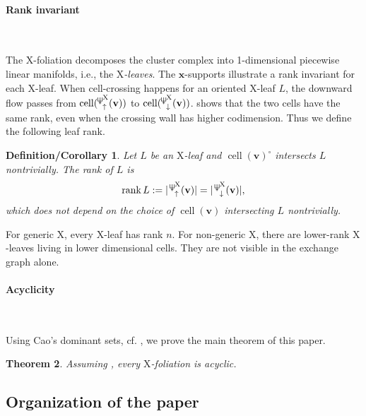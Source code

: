 \documentclass[11pt,reqno]{amsart}
\newcommand{\Neptune}{\mathord{\text{\tikz[baseline=-.5ex,scale=.13]{\draw[line width=.45pt] (0,0)--(0,1.8) (-.6,1.8)--(-.6,.8)--(.6,.8)--(.6,1.8) (-.35,.35)--(.35,.35);}}}}
\theoremstyle{plain}
\newtheorem{theorem}{Theorem}[section]
\newtheorem{cordef}[theorem]{Definition/Corollary}
\theoremstyle{definition}
\numberwithin{equation}{section}
\newcommand\<{\langle}
\renewcommand\>{\rangle}
\newcommand{\rank}{\operatorname{rank}}
\newcommand{\on}[1]{\operatorname{#1}}
\def\cc{\on{cell}}  %
\def\sphere{\on{S}}   %
\def\vv{\mathbf{v}}
\def\sink{X}
\newcommand{\ccpt}[1]{\mathrm{#1}}%
\def\xevo{\ccpt{X}}%
\def\xx{\mathbf{x}}%
\newcommand{\suppd}[1]{\operatorname{\Neptune}_{\downarrow}^{#1}}
\newcommand{\suppu}[1]{\operatorname{\Neptune}_{\uparrow}^{#1}}
\begin{document}
\paragraph{\textbf{Rank invariant}}\

The $\xevo$-foliation decomposes the cluster complex into 1-dimensional piecewise linear manifolds, i.e., the \emph{$\xevo$-leaves}.
The $\xx$-supports illustrate a rank invariant for each $\xevo$-leaf. 
When cell-crossing happens for an oriented $\xevo$-leaf $L$, the downward flow passes from $\cc(\suppu{\xevo}(\vv))$ to $\cc(\suppd{\xevo}(\vv))$. 
 shows that the two cells have the same rank, even when the crossing wall has higher codimension. 
Thus we define the following leaf rank.
\begin{cordef}
    Let $L$ be an $\xevo$-leaf and $\cc(\vv)^\circ$ intersects $L$ nontrivially. 
    The \emph{rank} of $L$ is
    \begin{gather}
        \rank L:=|\suppu{\xevo}(\vv)|=|\suppd{\xevo}(\vv)|,
    \end{gather}
    which does not depend on the choice of $\cc(\vv)$ intersecting $L$ nontrivially.
\end{cordef}
For generic $\xevo$, every $\xevo$-leaf has rank $n$. 
For non-generic $\xevo$, there are lower-rank $\xevo$-leaves living in lower dimensional cells. They are not visible in the exchange graph alone.

\paragraph{\textbf{Acyclicity}}\



Using Cao's dominant sets, cf. \cite{Cao}, we prove the main theorem of this paper.
\begin{theorem}
    Assuming ,
    every $\xevo$-foliation is acyclic.
\end{theorem}



\subsection{Organization of the paper}\label{sec:further}\
\end{document}
